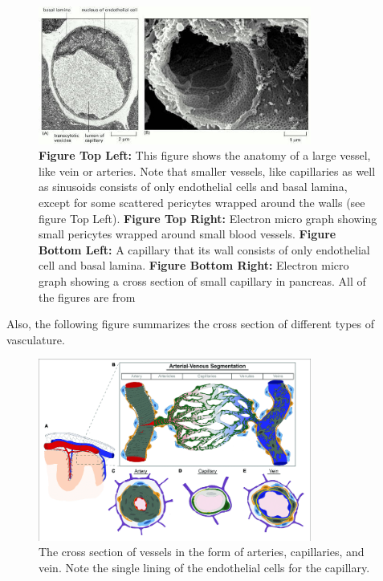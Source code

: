 \begin{figure}[h!]
	\centering
	\includegraphics[width=0.8\textwidth]{images/ElectronMicroscopeOfVessel.jpg}
	\caption{\textbf{Figure Top Left:} This figure shows the anatomy of a large vessel, like vein or arteries. Note that smaller vessels, like capillaries as well as sinusoids consists of only endothelial cells and basal lamina, except for some scattered pericytes wrapped around the walls (see figure Top Left). \textbf{Figure Top Right:} Electron micro graph showing small pericytes wrapped around small blood vessels. \textbf{Figure Bottom Left:} A capillary that its wall consists of only endothelial cell and basal lamina. \textbf{Figure Bottom Right:} Electron micro graph showing a cross section of small capillary in pancreas. All of the figures are from \cite{Alberts2002}}

\end{figure}
\FloatBarrier

Also, the following figure summarizes the cross section of different types of vasculature.
\begin{figure}[h!]
	\centering
	\includegraphics[width=0.8\textwidth]{images/CrossSectionOfVessels.png}
	\caption{The cross section of vessels in the form of arteries, capillaries, and vein. Note the single lining of the endothelial cells for the capillary.}
\end{figure}




